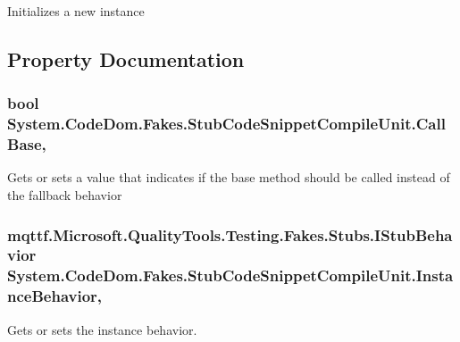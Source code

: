 Initializes a new instance



\subsection{Property Documentation}
\hypertarget{class_system_1_1_code_dom_1_1_fakes_1_1_stub_code_snippet_compile_unit_a1aa8f4a7cf55b4f51671e967f2f11ca2}{
\subsubsection[{Call\-Base}]{\setlength{\rightskip}{0pt plus 5cm}bool System.\-Code\-Dom.\-Fakes.\-Stub\-Code\-Snippet\-Compile\-Unit.\-Call\-Base\hspace{0.3cm}{\ttfamily [get]}, {\ttfamily [set]}}}\label{class_system_1_1_code_dom_1_1_fakes_1_1_stub_code_snippet_compile_unit_a1aa8f4a7cf55b4f51671e967f2f11ca2}


Gets or sets a value that indicates if the base method should be called instead of the fallback behavior

\hypertarget{class_system_1_1_code_dom_1_1_fakes_1_1_stub_code_snippet_compile_unit_a3c892d6449819fe0b2fe5078170993d1}{
\subsubsection[{Instance\-Behavior}]{\setlength{\rightskip}{0pt plus 5cm}mqttf.\-Microsoft.\-Quality\-Tools.\-Testing.\-Fakes.\-Stubs.\-I\-Stub\-Behavior System.\-Code\-Dom.\-Fakes.\-Stub\-Code\-Snippet\-Compile\-Unit.\-Instance\-Behavior\hspace{0.3cm}{\ttfamily [get]}, {\ttfamily [set]}}}\label{class_system_1_1_code_dom_1_1_fakes_1_1_stub_code_snippet_compile_unit_a3c892d6449819fe0b2fe5078170993d1}


Gets or sets the instance behavior.

